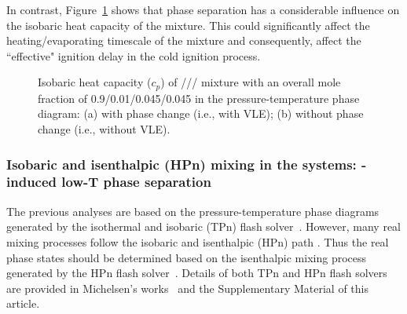     In contrast, Figure~\ref{fig:PTdiagram_cp} shows that phase separation has a considerable influence on the isobaric heat capacity of the mixture. This could significantly affect the heating/evaporating timescale of the mixture and consequently, affect the ``effective" ignition delay in the cold ignition process.

    \begin{figure}[htb]
        \centering


        \caption{Isobaric heat capacity ($c_p$) of /// mixture with an overall mole fraction of 0.9/0.01/0.045/0.045 in the pressure-temperature phase diagram: (a) with phase change (i.e., with VLE); (b) without phase change (i.e., without VLE).}
        \label{fig:PTdiagram_cp}
    \end{figure}


\subsubsection{Isobaric and isenthalpic (HPn) mixing in the  systems: -induced low-T phase separation} \label{sec:results:combustor:HPn}
The previous analyses %
are based on the pressure-temperature phase diagrams generated by the isothermal and isobaric (TPn) flash solver~\cite{michelsen1982isothermal}.
However, many real mixing processes follow the isobaric and isenthalpic (HPn) path \cite{serrano2018development}. Thus the real phase states should be determined based on the isenthalpic mixing process generated by the HPn flash solver~\cite{michelsen1987multiphase}. Details of both TPn and HPn flash solvers are provided in Michelsen's works~\cite{michelsen1982isothermal,michelsen1987multiphase} and the Supplementary Material of this article.

